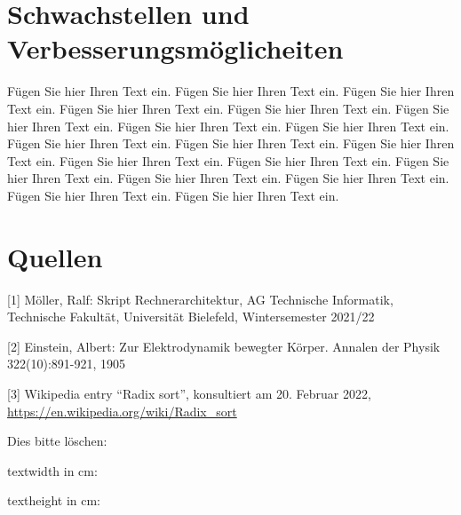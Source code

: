 \documentclass[12pt]{article}
\begin{document}
\section{Schwachstellen und Verbesserungsmöglicheiten}

Fügen Sie hier Ihren Text ein. Fügen Sie hier Ihren Text ein. Fügen
Sie hier Ihren Text ein. Fügen Sie hier Ihren Text ein. Fügen Sie hier
Ihren Text ein. Fügen Sie hier Ihren Text ein. Fügen Sie hier Ihren
Text ein. Fügen Sie hier Ihren Text ein. Fügen Sie hier Ihren Text
ein. Fügen Sie hier Ihren Text ein. Fügen Sie hier Ihren Text
ein. Fügen Sie hier Ihren Text ein. Fügen Sie hier Ihren Text
ein. Fügen Sie hier Ihren Text ein. Fügen Sie hier Ihren Text
ein. Fügen Sie hier Ihren Text ein. Fügen Sie hier Ihren Text
ein. Fügen Sie hier Ihren Text ein.


\newpage
\thispagestyle{empty}

\section*{Quellen}

{\parindent0pt%
  
[1] Möller, Ralf: Skript Rechnerarchitektur, AG Technische Informatik,
Technische Fakultät, Universität Bielefeld, Wintersemester 2021/22

[2] Einstein, Albert: Zur Elektrodynamik bewegter K{\"o}rper. Annalen
der Physik 322(10):891-921, 1905

[3] Wikipedia entry ``Radix sort'', konsultiert am 20. Februar 2022,
\url{https://en.wikipedia.org/wiki/Radix_sort}

}

\vspace*{3cm}

\noindent Dies bitte löschen:

\noindent textwidth in cm: \prntlen{\textwidth}

\noindent textheight in cm: \prntlen{\textheight}
\end{document}

